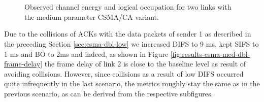 \begin{figure}[tb]
	\label{fig:results-csma-med-dbl-channel-meta}
	\begin{center}
		\\
		\\
	\end{center}
	\caption{Observed channel energy and logical occupation for two links with the medium parameter CSMA/CA variant.}
\end{figure}

Due to the collisions of ACKs with the data packets of sender 1 as described in the preceding Section \ref{sec:csma-dbl-low} we increased DIFS to 9 ms, kept SIFS to 1 ms and BO to 2ms and indeed, as shown in Figure \ref{fig:results-csma-med-dbl-frame-delay} the frame delay of link 2 is close to the baseline level as result of avoiding collisions. However, since collisions as a result of low DIFS occurred quite infrequently in the last scenario, the metrics roughly stay the same as in the previous scenario, as can be derived from the respective subfigures.


